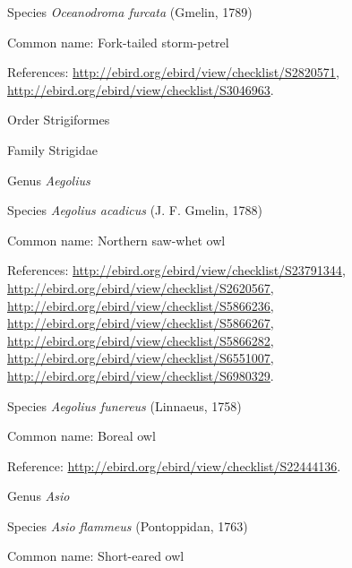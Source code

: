 \documentclass[9pt, article]{memoir}
\begin{document}
\begin{multicols}{2}
\vspace{6pt}\noindent\hspace{36pt}Species \textit{Oceanodroma furcata} (Gmelin, 1789)


Common name: Fork-tailed storm-petrel

References: 
\url{http://ebird.org/ebird/view/checklist/S2820571}, 
\url{http://ebird.org/ebird/view/checklist/S3046963}.

\vspace{6pt}\noindent\hspace{18pt}Order Strigiformes


\vspace{6pt}\noindent\hspace{24pt}Family Strigidae


\vspace{6pt}\noindent\hspace{30pt}Genus \textit{Aegolius}


\vspace{6pt}\noindent\hspace{36pt}Species \textit{Aegolius acadicus} (J. F. Gmelin, 1788)


Common name: Northern saw-whet owl

References: 
\url{http://ebird.org/ebird/view/checklist/S23791344}, 
\url{http://ebird.org/ebird/view/checklist/S2620567}, 
\url{http://ebird.org/ebird/view/checklist/S5866236}, 
\url{http://ebird.org/ebird/view/checklist/S5866267}, 
\url{http://ebird.org/ebird/view/checklist/S5866282}, 
\url{http://ebird.org/ebird/view/checklist/S6551007}, 
\url{http://ebird.org/ebird/view/checklist/S6980329}.

\vspace{6pt}\noindent\hspace{36pt}Species \textit{Aegolius funereus} (Linnaeus, 1758)


Common name: Boreal owl

Reference: 
\url{http://ebird.org/ebird/view/checklist/S22444136}.

\vspace{6pt}\noindent\hspace{30pt}Genus \textit{Asio}


\vspace{6pt}\noindent\hspace{36pt}Species \textit{Asio flammeus} (Pontoppidan, 1763)


Common name: Short-eared owl


\end{multicols}
\end{document}
